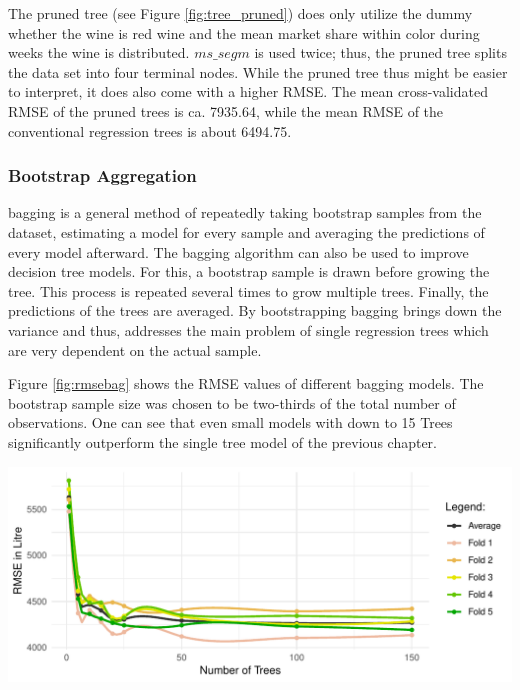 \documentclass[11pt,]{article}
\let\origfigure\figure
\let\endorigfigure\endfigure
\renewenvironment{figure}[1][2] {
    \expandafter\origfigure\expandafter[H]
} {
    \endorigfigure
}
\begin{document}
The pruned tree (see Figure \ref{fig:tree_pruned}) does only utilize the
dummy whether the wine is red wine and the mean market share within
color during weeks the wine is distributed. \(ms\_segm\) is used twice;
thus, the pruned tree splits the data set into four terminal nodes.
While the pruned tree thus might be easier to interpret, it does also
come with a higher \ac{RMSE}. The mean cross-validated \ac{RMSE} of the
pruned trees is ca. 7935.64, while the mean \ac{RMSE} of the
conventional regression trees is about 6494.75.

\hypertarget{bootstrap-aggregation}{%
\subsubsection{Bootstrap Aggregation}\label{bootstrap-aggregation}}

\ac{bagging} is a general method of repeatedly taking bootstrap samples
from the dataset, estimating a model for every sample and averaging the
predictions of every model afterward. The \ac{bagging} algorithm can
also be used to improve decision tree models. For this, a bootstrap
sample is drawn before growing the tree. This process is repeated
several times to grow multiple trees. Finally, the predictions of the
trees are averaged. By bootstrapping \ac{bagging} brings down the
variance and thus, addresses the main problem of single regression trees
which are very dependent on the actual sample.

Figure \ref{fig:rmsebag} shows the \ac{RMSE} values of different
\ac{bagging} models. The bootstrap sample size was chosen to be
two-thirds of the total number of observations. One can see that even
small models with down to 15 Trees significantly outperform the single
tree model of the previous chapter.

\begin{figure}

\includegraphics{../00_data/output_paper/14_bagging} \hfill{}

\caption[Bagging: RMSE's at Different Tree Sizes]{\label{fig:rmsebag}Bagging: RMSE's at Different Tree Sizes (Smoothed).}\label{fig:bag}
\end{figure}
\end{document}
